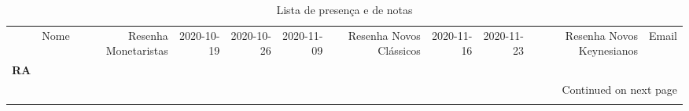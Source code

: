\documentclass[11pt]{article}
\begin{document}
\begin{center}\begin{landscape}
\small
\setlength\LTleft{0pt}
\setlength\LTright{0pt}
\begin{longtable}{llrrrrrrrrl}
\caption{Lista de presença e de notas}\label{lista}\\
\toprule
{} &                                   Nome &  Resenha Monetaristas &  2020-10-19 &  2020-10-26 &  2020-11-09 &  Resenha Novos Clássicos &  2020-11-16 &  2020-11-23 &  Resenha Novos Keynesianos &                   Email \\
\textbf{RA    } &                                        &                       &             &             &             &                          &             &             &                            &                         \\
\midrule
\endhead
\midrule
\multicolumn{11}{r}{{Continued on next page}} \\
\midrule
\endfoot


\end{longtable}
\end{landscape}
\end{center}
\end{document}

